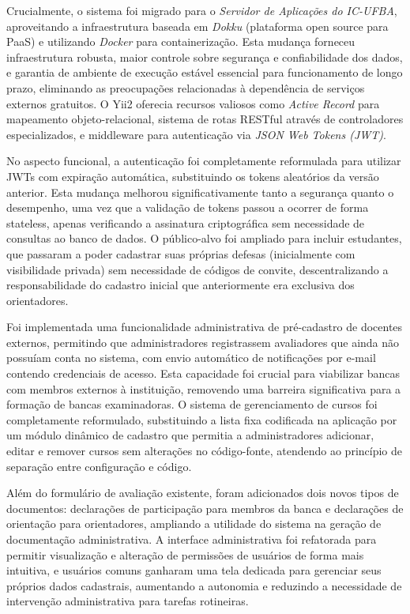 \documentclass[nonacm, sigconf]{acmart}
\begin{document}
Crucialmente, o sistema foi migrado para o \textit{Servidor de Aplicações do IC-UFBA}, aproveitando a infraestrutura baseada em \textit{Dokku} (plataforma open source para PaaS) e utilizando \textit{Docker} para containerização. Esta mudança forneceu infraestrutura robusta, maior controle sobre segurança e confiabilidade dos dados, e garantia de ambiente de execução estável essencial para funcionamento de longo prazo, eliminando as preocupações relacionadas à dependência de serviços externos gratuitos. O Yii2 oferecia recursos valiosos como \textit{Active Record} para mapeamento objeto-relacional, sistema de rotas RESTful através de controladores especializados, e middleware para autenticação via \textit{JSON Web Tokens (JWT)}.

No aspecto funcional, a autenticação foi completamente reformulada para utilizar JWTs com expiração automática, substituindo os tokens aleatórios da versão anterior. Esta mudança melhorou significativamente tanto a segurança quanto o desempenho, uma vez que a validação de tokens passou a ocorrer de forma stateless, apenas verificando a assinatura criptográfica sem necessidade de consultas ao banco de dados. O público-alvo foi ampliado para incluir estudantes, que passaram a poder cadastrar suas próprias defesas (inicialmente com visibilidade privada) sem necessidade de códigos de convite, descentralizando a responsabilidade do cadastro inicial que anteriormente era exclusiva dos orientadores.

Foi implementada uma funcionalidade administrativa de pré-cadastro de docentes externos, permitindo que administradores registrassem avaliadores que ainda não possuíam conta no sistema, com envio automático de notificações por e-mail contendo credenciais de acesso. Esta capacidade foi crucial para viabilizar bancas com membros externos à instituição, removendo uma barreira significativa para a formação de bancas examinadoras. O sistema de gerenciamento de cursos foi completamente reformulado, substituindo a lista fixa codificada na aplicação por um módulo dinâmico de cadastro que permitia a administradores adicionar, editar e remover cursos sem alterações no código-fonte, atendendo ao princípio de separação entre configuração e código.

Além do formulário de avaliação existente, foram adicionados dois novos tipos de documentos: declarações de participação para membros da banca e declarações de orientação para orientadores, ampliando a utilidade do sistema na geração de documentação administrativa. A interface administrativa foi refatorada para permitir visualização e alteração de permissões de usuários de forma mais intuitiva, e usuários comuns ganharam uma tela dedicada para gerenciar seus próprios dados cadastrais, aumentando a autonomia e reduzindo a necessidade de intervenção administrativa para tarefas rotineiras.
\end{document}
